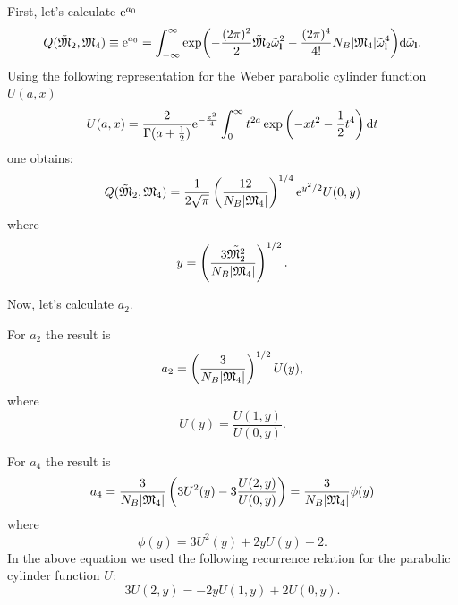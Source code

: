 First, let's calculate ${\rm e}^{a_0}$
\begin{equation}
	Q(\tilde{\mathfrak{M}}_2, \mathfrak{M}_4) \equiv {\rm e}^{a_0} = \int_{-\infty}^{\infty} 
	\exp(- \frac{(2\pi)^2}{2} \tilde{\mathfrak{M}}_2 \tilde{\omega}_{\vb l}^2 - \frac{(2\pi)^4}{4!}N_B \abs{\mathfrak{M}_4} \tilde{\omega}_{\vb l}^4) 
	{\rm d} \tilde{\omega}_{\vb l}.
\end{equation}
Using the following representation for the Weber parabolic cylinder function $U(a,x)$
	\begin{equation}
	\label{parab_cylinder_t4}
	U(a,x) = \frac{2}{\Gamma(a+\frac{1}{2})}{\rm e}^{-\frac{x^2}{4}} \int_{0}^{\infty}t^{2a}\exp\left(-xt^2 - \frac{1}{2}t^4\right) {\rm d} t
\end{equation}
one obtains:
\begin{equation}
	\label{quantity_Q}
	Q(\tilde{\mathfrak{M}}_2, \mathfrak{M}_4) = \frac{1}{2\sqrt{\pi}} \left(\frac{12}{N_B \abs{\mathfrak{M}_4}}\right)^{1/4} {\rm e}^{y^2/2} U(0,y)
\end{equation}
where 
\begin{equation}
	y = \left( \frac{3 \tilde{\mathfrak{M}_2^2}}{N_B \abs{\mathfrak{M}_4}}\right)^{1/2}.
\end{equation}

Now, let's calculate $a_2$.

For $a_2$ the result is
\begin{equation}
	a_2 = \left(\frac{3}{N_B \abs{\mathfrak{M}_4}}\right)^{1/2} U(y),
\end{equation}
where 
\begin{equation}
	U(y) = \frac{U(1,y)}{U(0,y)}.
\end{equation}

For $a_4$ the result is
\begin{equation}
	a_4 = \frac{3}{N_B \abs{\mathfrak{M}_4}}\left(3U^2(y) -3 \frac{U(2,y)}{U(0,y)}\right) = 
	\frac{3}{N_B \abs{\mathfrak{M}_4}} \phi(y)
\end{equation}
where 
\begin{equation}
	\phi(y) = 3U^2(y) + 2yU(y) - 2.
\end{equation}
In the above equation we used the following recurrence relation for the parabolic cylinder function $U$:
\begin{equation}
	3U(2,y) = -2yU(1,y) + 2U(0,y).
\end{equation}

